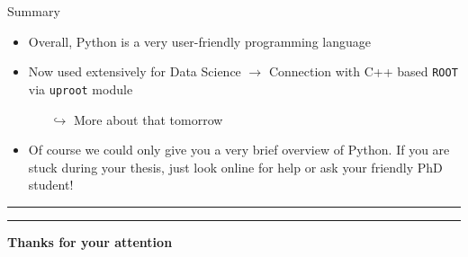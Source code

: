 \documentclass[10pt, aspectratio=169]{beamer}
\begin{document}
\begin{frame}{Summary}
\begin{itemize}
  \item
    Overall, Python is a very user-friendly programming language
  \item
    Now used extensively for Data Science {\color{ugoelogodark}$\rightarrow$} Connection with C++ based \texttt{ROOT} via \texttt{uproot} module
    \begin{itemize}
      \item[$\hookrightarrow$]
        More about that tomorrow
    \end{itemize}
  \item
    Of course we could only give you a very brief overview of Python. If you are stuck during your thesis, just look online for help or ask your friendly PhD student!
\end{itemize}
\hrule height0pt
\vfill
\hrule height0pt
\begin{center}
  \textbf{\Large \color{ugoelogodark}Thanks for your attention}
\end{center}
\end{frame}

\end{document}

